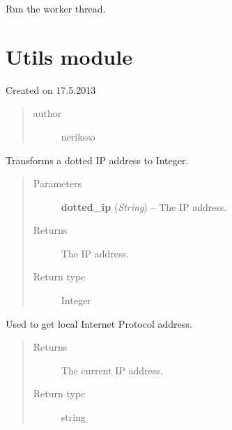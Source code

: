 \documentclass[letterpaper,10pt,english]{sphinxmanual}
\begin{document}
\begin{fulllineitems}
\begin{fulllineitems}
\end{fulllineitems}


\begin{fulllineitems}
\label{threads:threads.worker.WORKER_THREAD.run}
Run the worker thread.

\end{fulllineitems}


\end{fulllineitems}



\section{Utils module}
\label{utils:utils-module}\label{utils:module-utils}\label{utils::doc}
Created on 17.5.2013
\begin{quote}\begin{description}
\item[{author}] \leavevmode
neriksso

\end{description}\end{quote}

\begin{fulllineitems}
\label{utils:utils.DottedIPToInt}
Transforms a dotted IP address to Integer.
\begin{quote}\begin{description}
\item[{Parameters}] \leavevmode
\textbf{dotted\_ip} (\emph{String}) -- The IP address.

\item[{Returns}] \leavevmode
The IP address.

\item[{Return type}] \leavevmode
Integer

\end{description}\end{quote}

\end{fulllineitems}


\begin{fulllineitems}
\label{utils:utils.GetLocalIPAddress}
Used to get local Internet Protocol address.
\begin{quote}\begin{description}
\item[{Returns}] \leavevmode
The current IP address.

\item[{Return type}] \leavevmode
string

\end{description}\end{quote}

\end{fulllineitems}
\end{document}
